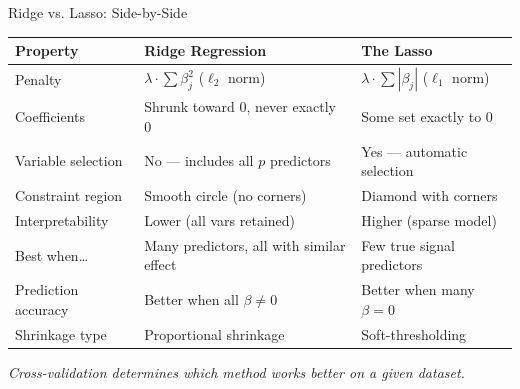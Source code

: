 \documentclass[ignorenonframetext,]{beamer}
\begin{document}
\begin{frame}{Ridge vs. Lasso: Side-by-Side}
\begin{center}
\scriptsize
\begin{tabular}{lll}
\toprule
\textbf{Property} & \textbf{Ridge Regression} & \textbf{The Lasso}\\
\midrule
Penalty & $\lambda\cdot\sum\beta_j^2$ ($\ell_2$ norm) & $\lambda\cdot\sum|\beta_j|$ ($\ell_1$ norm)\\
Coefficients & Shrunk toward 0, never exactly 0 & Some set exactly to 0\\
Variable selection & No --- includes all $p$ predictors & Yes --- automatic selection\\
Constraint region & Smooth circle (no corners) & Diamond with corners\\
Interpretability & Lower (all vars retained) & Higher (sparse model)\\
Best when\ldots & Many predictors, all with similar effect & Few true signal predictors\\
Prediction accuracy & Better when all $\beta \neq 0$ & Better when many $\beta = 0$\\
Shrinkage type & Proportional shrinkage & Soft-thresholding\\
\bottomrule
\end{tabular}
\end{center}

\centering
{\footnotesize\emph{Cross-validation determines which method works better on a given dataset.}}
\end{frame}
\end{document}

